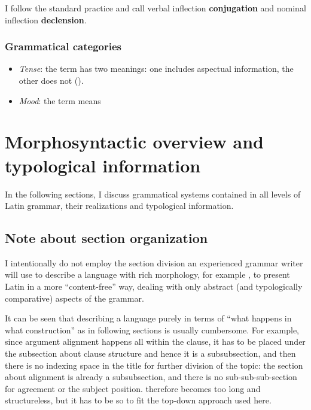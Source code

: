 \documentclass{article}
\newcommand*{\citechap}[1]{chap.~{#1}}
\newcommand*{\concept}[1]{\textbf{#1}}
\begin{document}
I follow the standard practice and call verbal inflection \concept{conjugation} 
and nominal inflection \concept{declension}.

\subsubsection{Grammatical categories}

\begin{itemize}
    \item \emph{Tense}: the term has two meanings: one includes aspectual information,
    the other does not (). 
    \item \emph{Mood}: the term means 
\end{itemize}

\section{Morphosyntactic overview and typological information}

In the following sections,
I discuss grammatical systems contained in all levels of Latin grammar,
their realizations and typological information.

\subsection{Note about section organization}\label{sec:organization}

I intentionally do not employ the section division 
an experienced grammar writer will use to describe a language with rich morphology,
for example \citet[\citechap{2}]{jacques2021grammar},
to present Latin in a more ``content-free'' way,
dealing with only abstract (and typologically comparative) aspects of the grammar.

It can be seen that describing a language purely in terms of 
``what happens in what construction''
as in following sections
is usually cumbersome.
For example, since argument alignment happens all within the clause,
it has to be placed under the subsection about clause structure
and hence it is a subsubsection,
and then there is no indexing space in the title for further division of the topic:
the section about alignment is already a subsubsection,
and there is no sub-sub-sub-section for agreement or the subject position.
 therefore becomes too long and structureless,
but it has to be so to fit the top-down approach used here.
\end{document}

